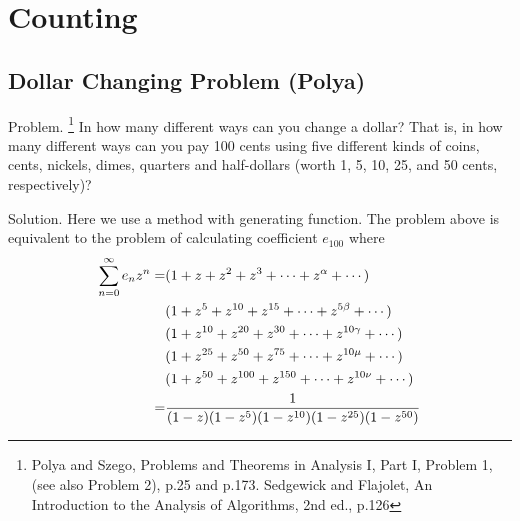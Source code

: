 \chapter{Counting}

\section{Dollar Changing Problem (Polya)}

Problem. 
\footnote{Polya and Szego, Problems and Theorems in Analysis I, Part I, 
          Problem 1, (see also Problem 2), p.25 and p.173.
          Sedgewick and Flajolet, An Introduction to the Analysis
          of Algorithms, 2nd ed., p.126 }
In how many different ways can you change a dollar? That is, in how many 
different ways can you pay 100 cents using five different kinds of coins,
cents, nickels, dimes, quarters and half-dollars (worth 1, 5, 10, 25, and
50 cents, respectively)?

Solution. Here we use a method with generating function. The problem 
above is equivalent to the problem of calculating coefficient $e_{100}$
where 
\begin{align*}
  \sum_{n=0}^{\infty} e_n z^n
    =& (1 + z + z^2 + z^3 + \cdots + z^{\alpha} + \cdots) \notag \\
    & (1 + z^5 + z^{10} + z^{15} + \cdots + z^{5\beta} + \cdots) \notag \\
    & (1 + z^{10} + z^{20} + z^{30} + \cdots + z^{10\gamma} + \cdots) \notag \\
    & (1 + z^{25} + z^{50} + z^{75} + \cdots + z^{10\mu} + \cdots) \notag \\
    & (1 + z^{50} + z^{100} + z^{150} + \cdots + z^{10\nu} + \cdots) \notag \\
    =& \frac{1}{(1-z)(1-z^5)(1-z^{10})(1-z^{25})(1-z^{50})} 
\end{align*}
  
